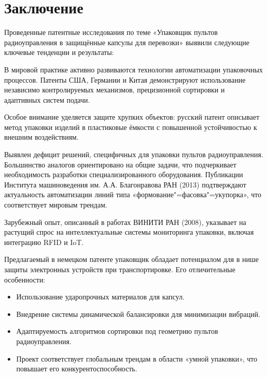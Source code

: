 \documentclass{bsuir}
\begin{document}
\maketitle
\mainmatter



\chapter*{Заключение}


Проведенные патентные исследования по теме «Упаковщик пультов радиоуправления в
защищённые капсулы для перевозки» выявили следующие ключевые тенденции и
результаты:

В мировой практике активно развиваются технологии автоматизации упаковочных
процессов. Патенты США, Германии и Китая демонстрируют использование независимо
контролируемых механизмов, прецизионной сортировки и адаптивных систем подачи.

Особое внимание уделяется защите хрупких объектов: русский патент описывает
метод упаковки изделий в пластиковые ёмкости с повышенной устойчивостью к
внешним воздействиям.

Выявлен дефицит решений, специфичных для упаковки пультов радиоуправления.
Большинство аналогов ориентировано на общие задачи, что подчеркивает
необходимость разработки специализированного оборудования. Публикации Института
машиноведения им. А.А. Благонравова РАН (2013) подтверждают актуальность
автоматизации линий типа «формование"=фасовка"=укупорка», что соответствует
мировым трендам.

Зарубежный опыт, описанный в работах ВИНИТИ РАН (2008), указывает на растущий
спрос на интеллектуальные системы мониторинга упаковки, включая интеграцию RFID
и IoT.

Предлагаемый в немецком патенте упаковщик обладает потенциалом для в нише защиты
электронных устройств при транспортировке. Его отличительные особенности:

\begin{itemize}
    \item Использование ударопрочных материалов для капсул.
    \item Внедрение системы динамической балансировки для минимизации вибраций.
    \item Адаптируемость алгоритмов сортировки под геометрию пультов радиоуправления.
    \item Проект соответствует глобальным трендам в области «умной упаковки»,
          что повышает его конкурентоспособность.
\end{itemize}
\end{document}
